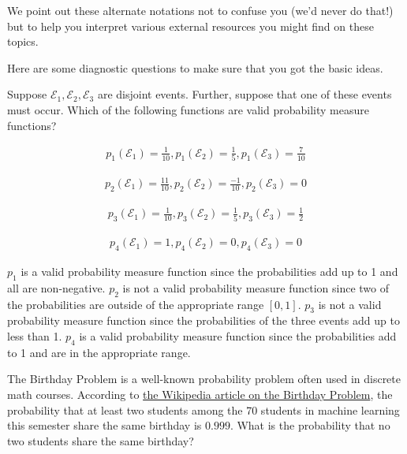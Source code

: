 \documentclass[assignment01_Solutions]{subfiles}
\begin{document}
We point out these alternate notations not to confuse you (we'd never do that!) but to help you interpret various external resources you might find on these topics.

\vspace{1em}
\begin{exercise}[(10 minutes)]
Here are some diagnostic questions to make sure that you got the basic ideas. 
\bes
\item Suppose $\mathcal{E}_1, \mathcal{E}_2, \mathcal{E}_3$ are disjoint events.  Further, suppose that one of these events must occur.  Which of the following functions are valid probability measure functions?

\begin{align}
p_1(\mathcal{E}_1)=\frac{1}{10} , p_1(\mathcal{E}_2)=\frac{1}{5}, p_1(\mathcal{E}_3)=\frac{7}{10} \nonumber
\end{align}


\begin{align}
p_2(\mathcal{E}_1)=\frac{11}{10} , p_2(\mathcal{E}_2)=\frac{-1}{10}, p_2(\mathcal{E}_3)= 0 \nonumber
\end{align}



\begin{align}
p_3(\mathcal{E}_1)=\frac{1}{10} , p_3(\mathcal{E}_2)=\frac{1}{5}, p_3(\mathcal{E}_3)=\frac{1}{2} \nonumber
\end{align}



\begin{align}
p_4(\mathcal{E}_1)=1 , p_4(\mathcal{E}_2)=0, p_4(\mathcal{E}_3)=0 \nonumber
\end{align}

\begin{boxedsolution}
$p_1$ is a valid probability measure function since the probabilities add up to 1 and all are non-negative.  $p_2$ is not a valid probability measure function since two of the probabilities are outside of the appropriate range $[0,1]$.  $p_3$ is not a valid probability measure function since the probabilities of the three events add up to less than 1. $p_4$ is a valid probability measure function since the probabilities add to 1 and are in the appropriate range.
\end{boxedsolution}

\item The Birthday Problem is a well-known probability problem often used in discrete math courses.  According to \href{https://en.wikipedia.org/wiki/Birthday_problem}{the Wikipedia article on the Birthday Problem}, the probability that at least two students among the 70 students in machine learning this semester share the same birthday is $0.999$.  What is the probability that no two students share the same birthday?


\end{exercise}
\end{document}
